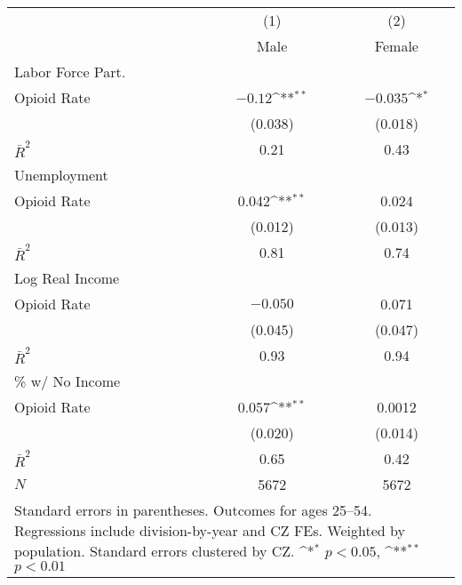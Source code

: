 {
\def\sym#1{\ifmmode^{#1}\else\(^{#1}\)\fi}
    \begin{tabular}{l*{2}{c}}
\hline\hline
            &\multicolumn{1}{c}{(1)}&\multicolumn{1}{c}{(2)}\\
            &\multicolumn{1}{c}{Male}&\multicolumn{1}{c}{Female}\\
\hline\hline
Labor Force Part.\\
\hline
Opioid Rate &       $-0.12$\sym{**}&      $-0.035$\sym{*} \\
            &     (0.038)        &     (0.018)        \\
\hline
$\bar{R}^2$ &        0.21        &        0.43        \\
\hline\hline
Unemployment \\
\hline
Opioid Rate &       0.042\sym{**}&       0.024        \\
            &     (0.012)        &     (0.013)        \\
\hline
$\bar{R}^2$ &        0.81        &        0.74        \\
\hline\hline
Log Real Income \\
\hline
Opioid Rate &      $-0.050$        &       0.071        \\
            &     (0.045)        &     (0.047)        \\
\hline
$\bar{R}^2$ &        0.93        &        0.94        \\
\hline\hline
\% w/ No Income \\
\hline
Opioid Rate &       0.057\sym{**}&      0.0012        \\
            &     (0.020)        &     (0.014)        \\
\hline
$\bar{R}^2$ &        0.65        &        0.42        \\
$N$         &        5672        &        5672        \\
\hline\hline
\multicolumn{3}{p{0.4\linewidth}}{\footnotesize Standard errors in parentheses.  Outcomes for ages 25--54.  Regressions include division-by-year and CZ FEs.  Weighted by population.  Standard errors clustered by CZ.  \sym{*} \(p<0.05\), \sym{**} \(p<0.01\)}\\
\end{tabular}
}

